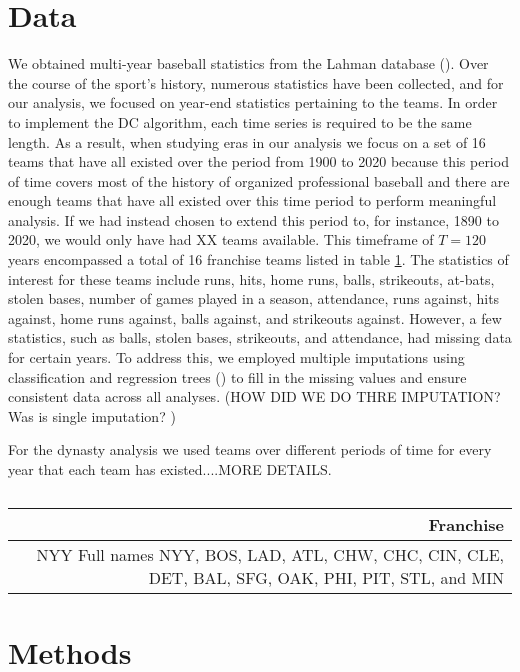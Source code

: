 \documentclass[USenglish]{article}
\theoremstyle{dgthm}
\theoremstyle{dgdef}
\begin{document}
\section{Data}
We obtained multi-year baseball statistics from the Lahman database (\cite{Friendly2021Lahman}). Over the course of the sport's history, numerous statistics have been collected, and for our analysis, we focused on year-end statistics pertaining to the teams. In order to implement the DC algorithm, each time series is required to be the same length.  As a result, when studying eras in our analysis we focus on a set of 16 teams that have all existed over the period from 1900 to 2020 because this period of time covers most of the history of organized professional baseball and there are enough teams that have all existed over this time period to perform meaningful analysis.  If we had instead chosen to extend this period to, for instance, 1890 to 2020, we would only have had XX teams available.   This timeframe of $T=120$ years encompassed a total of 16 franchise teams listed in table \ref{tab:120year:franch}. The statistics of interest for these teams include runs, hits, home runs, balls, strikeouts, at-bats, stolen bases, number of games played in a season, attendance, runs against, hits against, home runs against, balls against, and strikeouts against. However, a few statistics, such as balls, stolen bases, strikeouts, and attendance, had missing data for certain years. To address this, we employed multiple imputations using classification and regression trees (\cite{Vanbuuren1999flexible}) to fill in the missing values and ensure consistent data across all analyses.  (HOW DID WE DO THRE IMPUTATION?  Was is single imputation?  )

For the dynasty analysis we used teams over different periods of time for every year that each team has existed....MORE DETAILS.  

\begin{table}
\begin{tabular}{|r|}
Franchise  \\
\hline
NYY Full names 
 NYY, BOS, LAD, ATL, CHW, CHC, CIN, CLE, DET, BAL, SFG, OAK, PHI, PIT, STL, and MIN\\
\hline
\end{tabular}
\caption{}
\label{tab:120year:franch}
\end{table}



\section{Methods}
\end{document}
